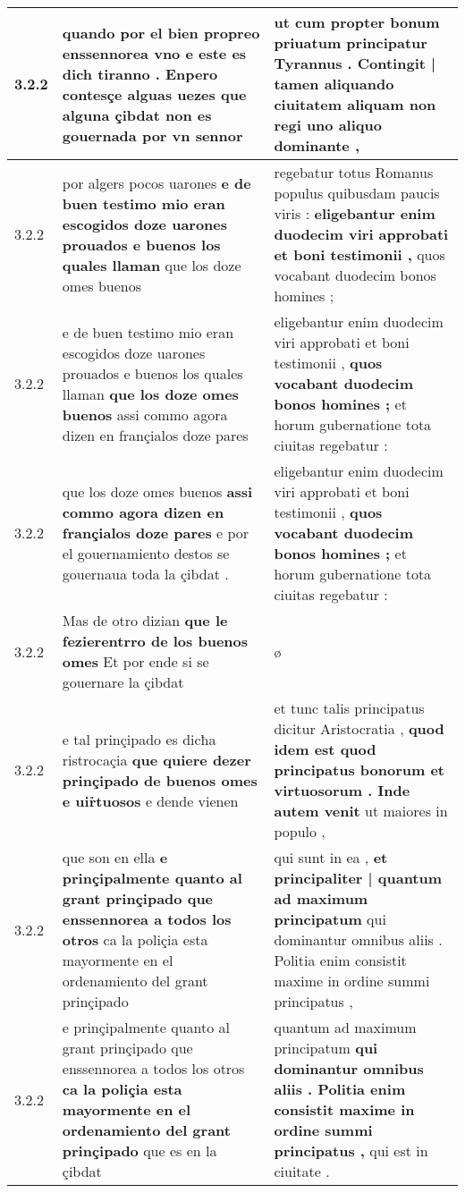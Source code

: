 \begin{tabular}{|p{1cm}|p{6.5cm}|p{6.5cm}|}
3.2.2 & quando por el bien propreo enssennorea vno \textbf{ e este es dich tiranno . Enpero contesçe alguas uezes } que alguna çibdat non es gouernada por vn sennor & ut cum propter bonum priuatum principatur Tyrannus . \textbf{ Contingit | tamen aliquando ciuitatem } aliquam non regi uno aliquo dominante , \\\hline
3.2.2 & por algers pocos uarones \textbf{ e de buen testimo mio eran escogidos doze uarones prouados e buenos los quales llaman } que los doze omes buenos & regebatur totus Romanus populus quibusdam paucis viris : \textbf{ eligebantur enim duodecim viri approbati et boni testimonii , } quos vocabant duodecim bonos homines ; \\\hline
3.2.2 & e de buen testimo mio eran escogidos doze uarones prouados e buenos los quales llaman \textbf{ que los doze omes buenos } assi commo agora dizen en françialos doze pares & eligebantur enim duodecim viri approbati et boni testimonii , \textbf{ quos vocabant duodecim bonos homines ; } et horum gubernatione tota ciuitas regebatur : \\\hline
3.2.2 & que los doze omes buenos \textbf{ assi commo agora dizen en françialos doze pares } e por el gouernamiento destos se gouernaua toda la çibdat . & eligebantur enim duodecim viri approbati et boni testimonii , \textbf{ quos vocabant duodecim bonos homines ; } et horum gubernatione tota ciuitas regebatur : \\\hline
3.2.2 & Mas de otro dizian \textbf{ que le fezierentrro de los buenos omes } Et por ende si se gouernare la çibdat & ø \\\hline
3.2.2 & e tal prinçipado es dicħa ristrocaçia \textbf{ que quiere dezer prinçipado de buenos omes e uir̉tuosos } e dende vienen & et tunc talis principatus dicitur Aristocratia , \textbf{ quod idem est quod principatus bonorum et virtuosorum . Inde autem venit } ut maiores in populo , \\\hline
3.2.2 & que son en ella \textbf{ e prinçipalmente quanto al grant prinçipado que enssennorea a todos los otros } ca la poliçia esta mayormente en el ordenamiento del grant prinçipado & qui sunt in ea , \textbf{ et principaliter | quantum ad maximum principatum } qui dominantur omnibus aliis . Politia enim consistit maxime in ordine summi principatus , \\\hline
3.2.2 & e prinçipalmente quanto al grant prinçipado que enssennorea a todos los otros \textbf{ ca la poliçia esta mayormente en el ordenamiento del grant prinçipado } que es en la çibdat & quantum ad maximum principatum \textbf{ qui dominantur omnibus aliis . Politia enim consistit maxime in ordine summi principatus , } qui est in ciuitate . \\\hline

\end{tabular}
